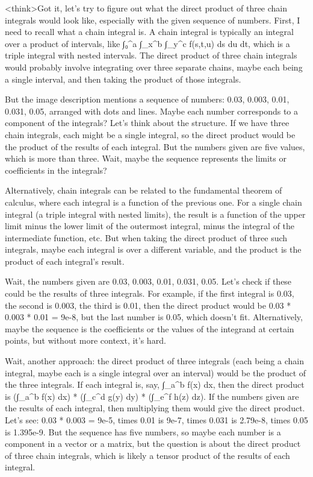 <think>Got it, let's try to figure out what the direct product of three chain integrals would look like, especially with the given sequence of numbers. First, I need to recall what a chain integral is. A chain integral is typically an integral over a product of intervals, like ∫₀^a ∫_x^b ∫_y^c f(s,t,u) ds du dt, which is a triple integral with nested intervals. The direct product of three chain integrals would probably involve integrating over three separate chains, maybe each being a single interval, and then taking the product of those integrals.

But the image description mentions a sequence of numbers: 0.03, 0.003, 0.01, 0.031, 0.05, arranged with dots and lines. Maybe each number corresponds to a component of the integrals? Let's think about the structure. If we have three chain integrals, each might be a single integral, so the direct product would be the product of the results of each integral. But the numbers given are five values, which is more than three. Wait, maybe the sequence represents the limits or coefficients in the integrals?

Alternatively, chain integrals can be related to the fundamental theorem of calculus, where each integral is a function of the previous one. For a single chain integral (a triple integral with nested limits), the result is a function of the upper limit minus the lower limit of the outermost integral, minus the integral of the intermediate function, etc. But when taking the direct product of three such integrals, maybe each integral is over a different variable, and the product is the product of each integral's result.

Wait, the numbers given are 0.03, 0.003, 0.01, 0.031, 0.05. Let's check if these could be the results of three integrals. For example, if the first integral is 0.03, the second is 0.003, the third is 0.01, then the direct product would be 0.03 * 0.003 * 0.01 = 9e-8, but the last number is 0.05, which doesn't fit. Alternatively, maybe the sequence is the coefficients or the values of the integrand at certain points, but without more context, it's hard.

Wait, another approach: the direct product of three integrals (each being a chain integral, maybe each is a single integral over an interval) would be the product of the three integrals. If each integral is, say, ∫_a^b f(x) dx, then the direct product is (∫_a^b f(x) dx) * (∫_c^d g(y) dy) * (∫_e^f h(z) dz). If the numbers given are the results of each integral, then multiplying them would give the direct product. Let's see: 0.03 * 0.003 = 9e-5, times 0.01 is 9e-7, times 0.031 is 2.79e-8, times 0.05 is 1.395e-9. But the sequence has five numbers, so maybe each number is a component in a vector or a matrix, but the question is about the direct product of three chain integrals, which is likely a tensor product of the results of each integral.

